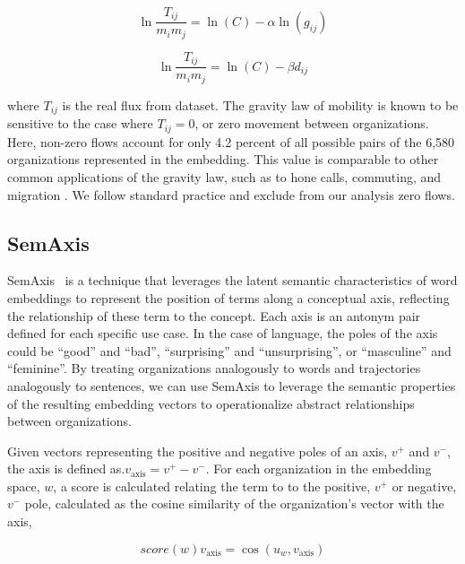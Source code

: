 \documentclass[12pt]{article} %
\begin{document}
\begin{equation}
	\label{eq:linear_flux_geo}
	\ln\frac{T_{ij}}{m_im_j} = \ln(C)  - \alpha \ln(g_{ij})
\end{equation}

\begin{equation}
	\label{eq:linear_flux_emb}
	\ln\frac{T_{ij}}{m_im_j} = \ln(C) - \beta d_{ij}
\end{equation}

where $T_{ij}$ is the real flux from dataset. The gravity law of mobility is known to be sensitive to the case where $T_{ij} = 0$, or zero movement between organizations.
Here, non-zero flows account for only 4.2 percent of all possible pairs of  the 6,580 organizations represented in the embedding.
This value is comparable to other common applications of the gravity law, such as to hone calls, commuting, and migration \autocite{simini2012universal}.
We follow standard practice and exclude from our analysis zero flows.


%
%
\subsection*{SemAxis}
SemAxis~\autocite{an2018semaxis} is a technique that leverages the latent semantic characteristics of word embeddings to represent the position of terms along a conceptual axis, reflecting the relationship of these term to the concept.
Each axis is an antonym pair defined for each specific use case.
In the case of language, the poles of the axis could be ``good'' and ``bad'', ``surprising'' and ``unsurprising'', or ``masculine'' and ``feminine''. 
By treating organizations analogously to words and trajectories analogously to sentences, we can use SemAxis to leverage the semantic properties of the resulting embedding vectors to operationalize abstract relationships between organizations. 

Given vectors representing the positive and negative poles of an axis, $v^{+}$ and $v^{-}$, the axis is defined as.$v_{\text{axis}} = v^{+} - v^{-}$. For each organization in the embedding space, $w$, a score is calculated relating the term to to the positive, $v^{+}$ or negative, $v^{-}$ pole, calculated as the cosine similarity of the organization's vector with the axis, 

$$
score(w)v_{\text{axis}} = \cos(u_{w}, v_{\text{axis}})
$$
\end{document}
